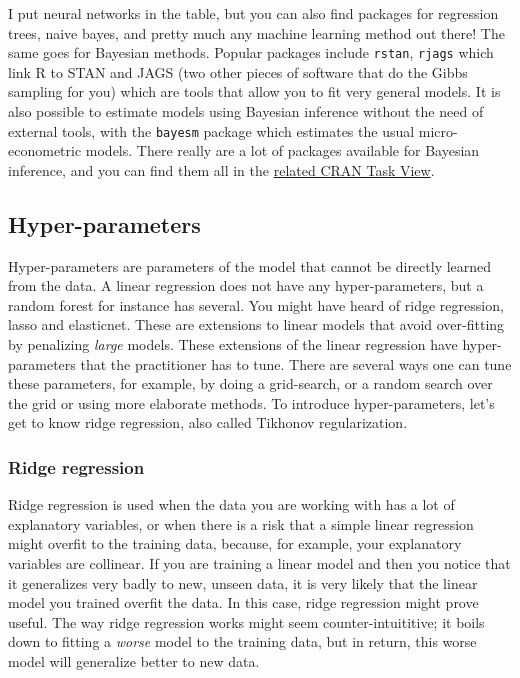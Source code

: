 \documentclass[]{gitbook}
\begin{document}
I put neural networks in the table, but you can also find packages for regression trees, naive
bayes, and pretty much any machine learning method out there! The same goes for Bayesian methods.
Popular packages include \texttt{rstan}, \texttt{rjags} which link R to STAN and JAGS (two other pieces of software
that do the Gibbs sampling for you) which are tools that allow you to fit very general models. It
is also possible to estimate models using Bayesian inference without the need of external tools,
with the \texttt{bayesm} package which estimates the usual micro-econometric models.
There really are a lot of packages available for Bayesian inference, and you can find them all in the
\href{https://cran.r-project.org/web/views/Bayesian.html}{related CRAN Task View}.

\hypertarget{hyper-parameters}{%
\subsection{Hyper-parameters}\label{hyper-parameters}}

Hyper-parameters are parameters of the model that cannot be directly learned from the data.
A linear regression does not have any hyper-parameters, but a random forest for instance has several.
You might have heard of ridge regression, lasso and elasticnet. These are
extensions to linear models that avoid over-fitting by penalizing \emph{large} models. These
extensions of the linear regression have hyper-parameters that the practitioner has to tune. There
are several ways one can tune these parameters, for example, by doing a grid-search, or a random
search over the grid or using more elaborate methods. To introduce hyper-parameters, let's get
to know ridge regression, also called Tikhonov regularization.

\hypertarget{ridge-regression}{%
\subsubsection{Ridge regression}\label{ridge-regression}}

Ridge regression is used when the data you are working with has a lot of explanatory variables,
or when there is a risk that a simple linear regression might overfit to the training data, because,
for example, your explanatory variables are collinear.
If you are training a linear model and then you notice that it generalizes very badly to new,
unseen data, it is very likely that the linear model you trained overfit the data.
In this case, ridge regression might prove useful. The way ridge regression works might seem
counter-intuititive; it boils down to fitting a \emph{worse} model to the training data, but in return,
this worse model will generalize better to new data.
\end{document}
